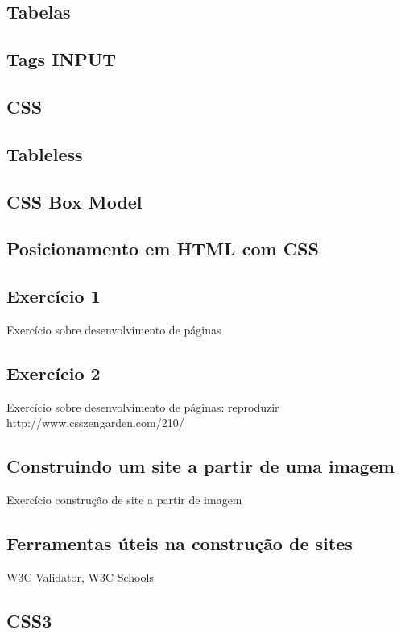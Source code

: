 \subsection{Tabelas}

\subsection{Tags INPUT}

\subsection{CSS}

\subsection{Tableless}

\subsection{CSS Box Model}

\subsection{Posicionamento em HTML com CSS}

\subsection{Exercício 1}
Exercício sobre desenvolvimento de páginas

\subsection{Exercício 2}
Exercício sobre desenvolvimento de páginas: reproduzir http://www.csszengarden.com/210/

\subsection{Construindo um site a partir de uma imagem}
Exercício construção de site a partir de imagem

\subsection{Ferramentas úteis na construção de sites}
W3C Validator, W3C Schools

\subsection{CSS3}
